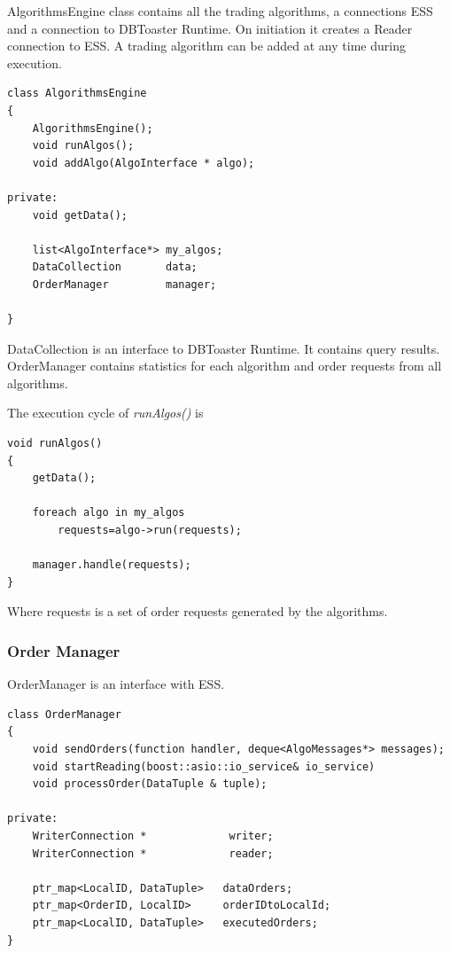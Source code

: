 \documentclass[14pt]{article}
\begin{document}
AlgorithmsEngine class contains all the trading algorithms, a connections ESS and a connection to DBToaster Runtime. On initiation it creates a Reader connection to ESS. A trading algorithm can be added at any time during execution. 

\begin{verbatim}
class AlgorithmsEngine
{
    AlgorithmsEngine();
    void runAlgos();
    void addAlgo(AlgoInterface * algo);

private:
    void getData();
    
    list<AlgoInterface*> my_algos;
    DataCollection       data;
    OrderManager         manager;
	
}
\end{verbatim}

DataCollection is an interface to DBToaster Runtime. It contains query results. OrderManager contains statistics for each algorithm and order requests from all algorithms. 

The execution cycle of \emph{runAlgos()} is

\begin{verbatim}
void runAlgos()
{
    getData();
    
    foreach algo in my_algos
        requests=algo->run(requests);
    
    manager.handle(requests);
}
\end{verbatim}

Where requests is a set of order requests generated by the algorithms.


\subsubsection{Order Manager}
OrderManager is an interface with ESS. 

\begin{verbatim}
class OrderManager
{
    void sendOrders(function handler, deque<AlgoMessages*> messages);
    void startReading(boost::asio::io_service& io_service)
    void processOrder(DataTuple & tuple);
    
private:
    WriterConnection *             writer;
    WriterConnection *             reader;

    ptr_map<LocalID, DataTuple>   dataOrders;
    ptr_map<OrderID, LocalID>     orderIDtoLocalId;
    ptr_map<LocalID, DataTuple>   executedOrders;
}
\end{verbatim}
\end{document}
